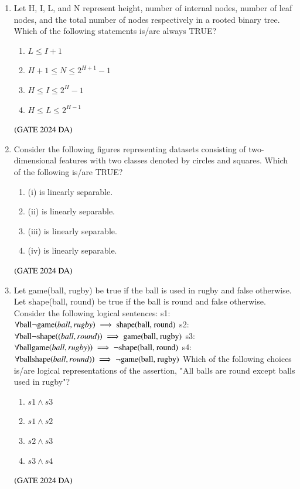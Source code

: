 \documentclass[journal,12pt,onecolumn]{IEEEtran}
\theoremstyle{remark}
\begin{document}
\begin{enumerate}[resume]
\item Let H, I, L, and N represent height, number of internal nodes, number of leaf nodes, and the total number of nodes respectively in a rooted binary tree. Which of the following statements is/are always TRUE?
\begin{multicols}{4}
\begin{enumerate}
\item $L \le I + 1$
\item $H + 1 \le N \le 2^{H+1} - 1$
\item $H \le I \le 2^H - 1$
\item $H \le L \le 2^{H-1}$
\end{enumerate}
\end{multicols}
\hfill $\left(\text{GATE 2024 DA}\right)$


\item Consider the following figures representing datasets consisting of two-dimensional features with two classes denoted by circles and squares.
Which of the following is/are TRUE?
\begin{multicols}{2}
\begin{enumerate}
\item (i) is linearly separable.
\item (ii) is linearly separable.
\item (iii) is linearly separable.
\item (iv) is linearly separable.
\end{enumerate}
\end{multicols}
\hfill $\left(\text{GATE 2024 DA}\right)$


\item Let game(ball, rugby) be true if the ball is used in rugby and false otherwise. Let shape(ball, round) be true if the ball is round and false otherwise. Consider the following logical sentences:
s1: $\forall \text{ball} \neg \text{{game\ensuremath{\left(ball, rugby\right)}}} \implies \text{shape(ball, round)}$
s2: $\forall \text{ball} \neg \text{shape\ensuremath{\left((ball, round)\right)}} \implies \text{game(ball, rugby)}$
s3: $\forall \text{ball} \text{game\ensuremath{\left(ball, rugby)\right)}} \implies \neg \text{shape(ball, round)}$
s4: $\forall \text{ball} \text{shape\ensuremath{\left(ball, round)\right)}} \implies \neg \text{game(ball, rugby)}$
Which of the following choices is/are logical representations of the assertion, "All balls are round except balls used in rugby"?
\begin{multicols}{4}
\begin{enumerate}
\item $s1 \land s3$
\item $s1 \land s2$
\item $s2 \land s3$
\item $s3 \land s4$
\end{enumerate}
\end{multicols}
\hfill $\left(\text{GATE 2024 DA}\right)$



\end{enumerate}
\end{document}
